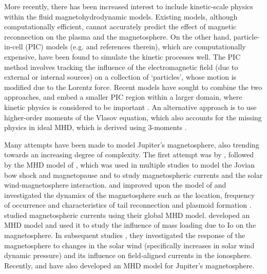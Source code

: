 More recently, there has been increased interest to include kinetic-scale physics within the fluid magnetohydrodynamic models. Existing models, although computationally efficient, cannot accurately predict the effect of magnetic reconnection on the plasma and the magnetosphere. On the other hand, particle-in-cell (PIC) models (e.g.  and references therein), which are computationally expensive, have been found to simulate the kinetic processes well. The PIC method involves tracking the influence of the electromagnetic field (due to external or internal sources) on a collection of `particles', whose motion is modified due to the Lorentz force. Recent models have sought to combine the two approaches, and embed a smaller PIC region within a larger domain, where kinetic physics is considered to be important \cite{Daldorff2014Two-wayModel}. An alternative approach is to use higher-order moments of the Vlasov equation, which also accounts for the missing physics in ideal MHD, which is derived using 3-moments \cite{Wang2015ComparisonReconnection}.

Many attempts have been made to model Jupiter's magnetosphere, also trending towards an increasing degree of complexity. The first attempt was by , followed by the MHD model of , which was used in multiple studies to model the Jovian bow shock and magnetopause \cite{Joy2002a} and to study magnetospheric currents and the solar wind‐magnetosphere interaction.  and  improved upon the model of  and investigated the dynamics of the magnetosphere such as the location, frequency of occurrence and characteristics of tail reconnection and plasmoid formation \cite{Fukazawa2010a}.  studied magnetospheric currents using their global MHD model.  developed an MHD model and used it to study the influence of mass loading due to Io on the magnetosphere. In subsequent studies \cite{Chane2017a,Chane2018}, they investigated the response of the magnetosphere to changes in the solar wind (specifically increases in solar wind dynamic pressure) and its influence on field‐aligned currents in the ionosphere. Recently,  and  have also developed an MHD model for Jupiter's magnetosphere.

